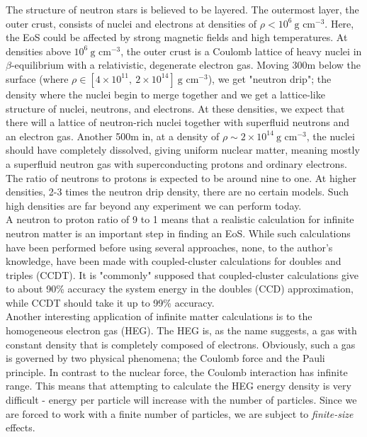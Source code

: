 \documentclass[10pt,twoside]{report}
\begin{document}
	The structure of neutron stars \cite{ShapiroTeukolsky83} is believed to be layered. The outermost layer, the outer crust, consists of nuclei and electrons at densities of $\rho<10^6\:\text{g cm}^{-3}$. Here, the EoS could be affected by strong magnetic fields and high temperatures. At densities above $10^6\:\text{g cm}^{-3}$, the outer crust is a Coulomb lattice of heavy nuclei in $\beta$-equilibrium with a relativistic, degenerate electron gas. Moving 300m below the surface (where $\rho \in [4\times10^{11},\:2\times10^{14}]\:\text{g cm}^{-3}$), we get "neutron drip"; the density where the nuclei begin to merge together and we get a lattice-like structure of nuclei, neutrons, and electrons. At these densities, we expect that there will a lattice of neutron-rich nuclei together with superfluid neutrons and an electron gas. Another 500m in, at a density of $\rho\sim 2\times10^{14}\:\text{g cm}^{-3}$, the nuclei should have completely dissolved, giving uniform nuclear matter, meaning mostly a superfluid neutron gas with superconducting protons and ordinary electrons. The ratio of neutrons to protons is expected to be around nine to one. At higher densities, 2-3 times the neutron drip density, there are no certain models. Such high densities are far beyond any experiment we can perform today.\\
	
	A neutron to proton ratio of 9 to 1 means that a realistic calculation for infinite neutron matter is an important step in finding an EoS. While such calculations have been performed before using several approaches, none, to the author's knowledge, have been made with coupled-cluster calculations for doubles and triples (CCDT). It is "commonly" supposed \cite{ShavittBartlett09} that coupled-cluster calculations give to about 90\% accuracy the system energy in the doubles (CCD) approximation, while CCDT should take it up to 99\% accuracy.\\
	
	Another interesting application of infinite matter calculations is to the homogeneous electron gas (HEG). The HEG is, as the name suggests, a gas with constant density that is completely composed of electrons. Obviously, such a gas is governed by two physical phenomena; the Coulomb force and the Pauli principle. In contrast to the nuclear force, the Coulomb interaction has infinite range. This means that attempting to calculate the HEG energy density is very difficult - energy per particle will increase with the number of particles. Since we are forced to work with a finite number of particles, we are subject to \emph{finite-size} effects. 
	
\end{document}
